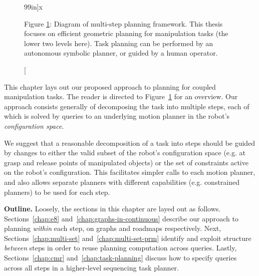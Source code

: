 \begin{figure}
\begin{center}

   \caption[][99in]{x}
   \label{fig:xx-diagram-multi-step}

   \end{center}
   
   \smallskip\noindent\small Figure \ref{fig:xx-diagram-multi-step}:
      Diagram of multi-step planning framework.
      This thesis focuses on efficient geometric planning
      for manipulation tasks (the lower two levels here).
      Task planning can be performed by an autonomous
      symbolic planner,
      or guided by a human operator.
\end{figure}

This chapter lays out our proposed approach
to planning for coupled manipulation tasks.
The reader is directed to
Figure~\ref{fig:xx-diagram-multi-step}
for an overview.
Our approach consists generally of decomposing the task into
multiple steps,
each of which is solved by queries to an underlying motion
planner in the robot's
\emph{configuration space}\cite{lozanoperez1983cspace}.


We suggest that a reasonable decomposition of a task into steps
should be guided by changes to either
the valid subset of the robot's configuration space
(e.g. at grasp and release points of manipulated objects)
or the set of constraints active on the robot's configuration.
This facilitates simpler calls to each motion planner,
and also allows separate planners with different capabilities
(e.g. constrained planners)
to be used for each step.

\textbf{Outline.}
Loosely, the sections in this chapter are layed out as follows.
Sections~\ref{chap:e8} and~\ref{chap:graphs-in-continuous}
describe our approach to planning \emph{within} each step,
on graphs and roadmaps respectively.
Next,
Sections~\ref{chap:multi-set} and~\ref{chap:multi-set-prm}
identify and exploit structure \emph{between} steps
in order to reuse planning computation across queries.
Lastly,
Sections~\ref{chap:cmr} and~\ref{chap:task-planning}
discuss how to specify queries across all steps
in a higher-level sequencing task planner.


